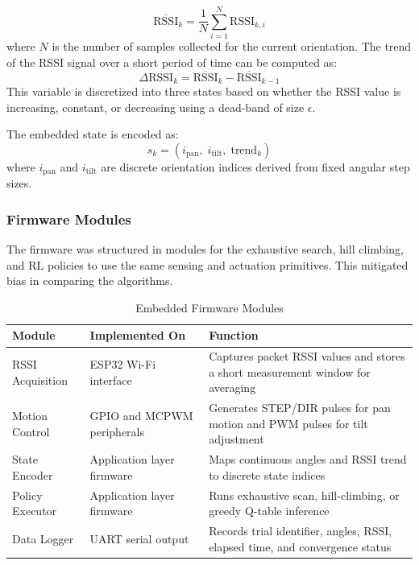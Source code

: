 \begin{equation}
\overline{\text{RSSI}}_k = \frac{1}{N} \sum_{i=1}^{N} \text{RSSI}_{k,i}
\end{equation}
where $N$ is the number of samples collected for the current orientation. The trend
of the RSSI signal over a short period of time can be computed as:
\begin{equation}
\Delta \text{RSSI}_k = \overline{\text{RSSI}}_k - \overline{\text{RSSI}}_{k-1}
\end{equation}
This variable is discretized into three states based on whether the RSSI value
is increasing, constant, or decreasing using a dead-band of size $\epsilon$.

The embedded state is encoded as:
\begin{equation}
s_k = \left( i_{\text{pan}},\; i_{\text{tilt}},\; \text{trend}_k \right)
\end{equation}
where $i_{\text{pan}}$ and $i_{\text{tilt}}$ are discrete orientation indices derived from
fixed angular step sizes.

\subsubsection{Firmware Modules}

The firmware was structured in modules for the exhaustive search, hill climbing, and RL policies to use the same sensing and actuation primitives. This mitigated bias in comparing the algorithms.

\vspace{0.5cm}
\begin{table}[H]
\centering
\caption{Embedded Firmware Modules}
\label{tab:firmware_modules}
\renewcommand{\arraystretch}{1.4}
\begin{tabular}{|
>{\raggedright\arraybackslash}p{3.2cm}|
>{\raggedright\arraybackslash}p{4.2cm}|
>{\raggedright\arraybackslash}p{5.2cm}|
}
\hline
\textbf{Module} & \textbf{Implemented On} & \textbf{Function} \\
\hline
RSSI Acquisition & ESP32 Wi-Fi interface & Captures packet RSSI values and stores a short measurement window for averaging \\
\hline
Motion Control & GPIO and MCPWM peripherals & Generates STEP/DIR pulses for pan motion and PWM pulses for tilt adjustment \\
\hline
State Encoder & Application layer firmware & Maps continuous angles and RSSI trend to discrete state indices \\
\hline
Policy Executor & Application layer firmware & Runs exhaustive scan, hill-climbing, or greedy Q-table inference \\
\hline
Data Logger & UART serial output & Records trial identifier, angles, RSSI, elapsed time, and convergence status \\
\hline
\end{tabular}
\end{table}

